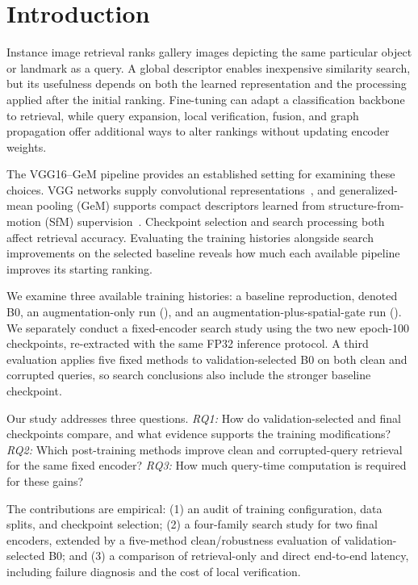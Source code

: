 \section{Introduction}
Instance image retrieval ranks gallery images depicting the same particular object or landmark as a query. A global descriptor enables inexpensive similarity search, but its usefulness depends on both the learned representation and the processing applied after the initial ranking. Fine-tuning can adapt a classification backbone to retrieval, while query expansion, local verification, fusion, and graph propagation offer additional ways to alter rankings without updating encoder weights.

The VGG16--GeM pipeline provides an established setting for examining these choices. VGG networks supply convolutional representations~\cite{vgg}, and generalized-mean pooling (GeM) supports compact descriptors learned from structure-from-motion (SfM) supervision~\cite{gem}. Checkpoint selection and search processing both affect retrieval accuracy. Evaluating the training histories alongside search improvements on the selected baseline reveals how much each available pipeline improves its starting ranking.

We examine three available training histories: a baseline reproduction, denoted B0, an augmentation-only run (\Rone), and an augmentation-plus-spatial-gate run (\Rtwo). We separately conduct a fixed-encoder search study using the two new epoch-100 checkpoints, re-extracted with the same FP32 inference protocol. A third evaluation applies five fixed methods to validation-selected B0 on both clean and corrupted queries, so search conclusions also include the stronger baseline checkpoint.

Our study addresses three questions. \emph{RQ1:} How do validation-selected and final checkpoints compare, and what evidence supports the training modifications? \emph{RQ2:} Which post-training methods improve clean and corrupted-query retrieval for the same fixed encoder? \emph{RQ3:} How much query-time computation is required for these gains?

The contributions are empirical: (1) an audit of training configuration, data splits, and checkpoint selection; (2) a four-family search study for two final encoders, extended by a five-method clean/robustness evaluation of validation-selected B0; and (3) a comparison of retrieval-only and direct end-to-end latency, including failure diagnosis and the cost of local verification.
